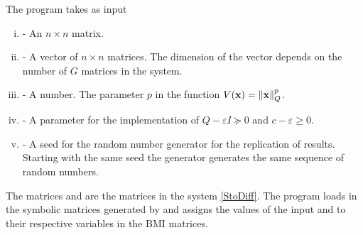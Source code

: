 \documentclass[a4paper,12pt,twoside,BCOR=10mm]{scrbook}
\begin{document}
The program  takes as input
\begin{enumerate}[i)]
    \item {} - An $n\times n$ matrix.
    \item {} - A vector of $n \times n$ matrices. The dimension of the vector depends on the number of $G$ matrices in the system.
    \item {} - A number. The parameter $p$ in the function $V(\mathbf{x}) = \left\lVert\mathbf{x}\right\rVert_Q^p$.
    \item {} - A parameter for the implementation of $Q - \varepsilon I \succeq 0$ and $c - \varepsilon \geq 0$.
    \item {} - A seed for the random number generator for the replication of results. Starting with the same seed the generator generates the same sequence of random numbers.
\end{enumerate}

The matrices  and  are the matrices in the system \eqref{StoDiff}. The program loads in the symbolic matrices generated by  and assigns the values of the input  and  to their respective variables in the BMI matrices.
\end{document}
